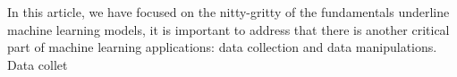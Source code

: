 In this article, we have focused on the nitty-gritty of the fundamentals underline machine learning models, it is important to address that there is another critical part of machine learning applications: data collection and data manipulations. Data collet 